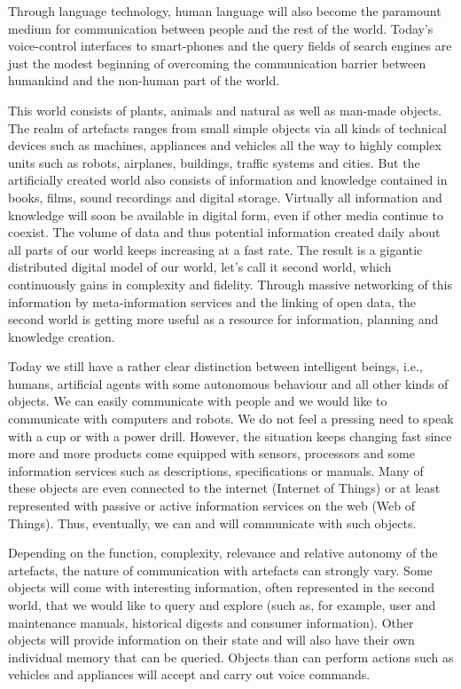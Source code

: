 \documentclass[10pt, plain]{../../metanetpaper}
\begin{document}
\begin{multicols}{2}
Through language technology, human language will also become the paramount medium for communication between people and the rest of the world. Today’s voice-control interfaces to smart-phones and the query fields of search engines are just the modest beginning of overcoming the communication barrier between humankind and the non-human part of the world.
 
This world consists of plants, animals and natural as well as man-made objects. The realm of artefacts ranges from small simple objects via all kinds of technical devices such as machines, appliances and vehicles all the way to highly complex units such as robots, airplanes, buildings, traffic systems and cities. But the artificially created world also consists of information and knowledge contained in books, films, sound recordings and digital storage. Virtually all information and knowledge will soon be available in digital form, even if other media continue to coexist. The volume of data and thus potential information created daily about all parts of our world keeps increasing at a fast rate. The result is a gigantic distributed digital model of our world, let’s call it second world, which continuously gains in complexity and fidelity. Through massive networking of this information by meta-information services and the linking of open data, the second world is getting more useful as a resource for information, planning and knowledge creation. 
 
Today we still have a rather clear distinction between intelligent beings, i.e., humans, artificial agents with some autonomous behaviour and all other kinds of objects. We can easily communicate with people and we would like to communicate with computers and robots. We do not feel a pressing need to speak with a cup or with a power drill. However, the situation keeps changing fast since more and more products come equipped with sensors, processors and some information services such as descriptions, specifications or manuals. Many of these objects are even connected to the internet (Internet of Things) or at least represented with passive or active information services on the web (Web of Things). Thus, eventually, we can and will communicate with such objects.
 
Depending on the function, complexity, relevance and relative autonomy of the artefacts, the nature of communication with artefacts can strongly vary. Some objects will come with interesting information, often represented in the second world, that we would like to query and explore (such as, for example, user and maintenance manuals, historical digests and consumer information). Other objects will provide information on their state and will also have their own individual memory that can be queried. Objects than can perform actions such as vehicles and appliances will accept and carry out voice commands. 
 

\end{multicols}
\end{document}
